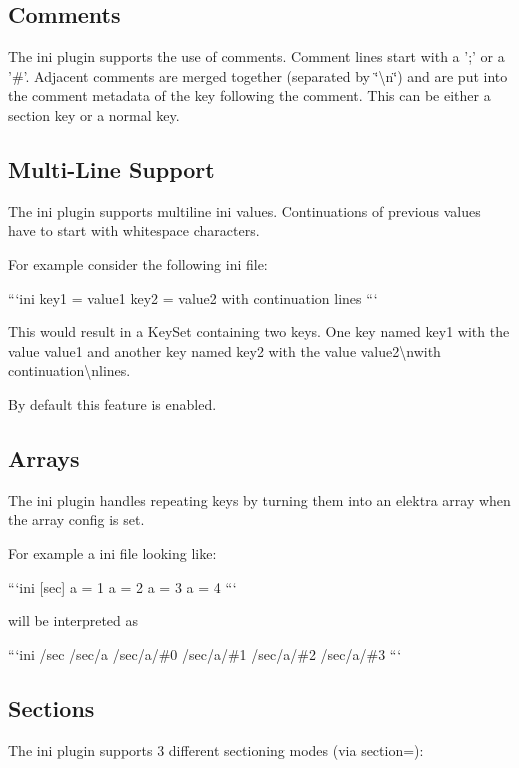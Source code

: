 \subsection*{Comments}

The ini plugin supports the use of comments. Comment lines start with a ';' or a '\#'. Adjacent comments are merged together (separated by \char`\"{}\textbackslash{}n\char`\"{}) and are put into the comment metadata of the key following the comment. This can be either a section key or a normal key.

\subsection*{Multi-\/\+Line Support}

The ini plugin supports multiline ini values. Continuations of previous values have to start with whitespace characters.

For example consider the following ini file\+:

```ini key1 = value1 key2 = value2 with continuation lines ```

This would result in a Key\+Set containing two keys. One key named {\ttfamily key1} with the value {\ttfamily value1} and another key named {\ttfamily key2} with the value {\ttfamily value2\textbackslash{}nwith continuation\textbackslash{}nlines}.

By default this feature is enabled.

\subsection*{Arrays}

The ini plugin handles repeating keys by turning them into an elektra array when the {\ttfamily array} config is set.

For example a ini file looking like\+:

```ini \mbox{[}sec\mbox{]} a = 1 a = 2 a = 3 a = 4 ```

will be interpreted as

```ini /sec /sec/a /sec/a/\#0 /sec/a/\#1 /sec/a/\#2 /sec/a/\#3 ```

\subsection*{Sections}

The ini plugin supports 3 different sectioning modes (via {\ttfamily section=})\+:



